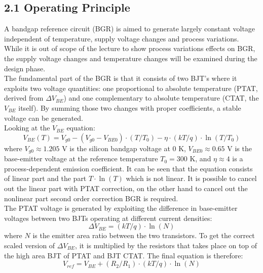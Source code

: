 \documentclass[12pt]{article}
\begin{document}
\subsection*{2.1 Operating Principle}
A bandgap reference circuit (BGR) is aimed to generate largely constant voltage independent of temperature, supply voltage changes and process variations. While it is out of scope of the lecture to show process variations effects on BGR, the supply voltage changes and temperature changes will be examined during the design phase.\\ 
\newline
\noindent
The fundamental part of the BGR is that it consists of two BJT’s where it exploits two voltage quantities: one proportional to absolute temperature (PTAT, derived from $\Delta V_{BE}$) and one complementary to absolute temperature (CTAT, the $V_{BE}$ itself). By summing those two changes with proper coefficients, a stable voltage can be generated. \\
\newline
\noindent
Looking at the $V_{BE}$ equation: 
\begin{equation}
V_{BE}(T) = V_{g0} - (V_{g0} - V_{BE0}) \cdot (T/T_0) - \eta \cdot (kT/q) \cdot \ln(T/T_0)
\end{equation}
where $V_{g0} \approx 1.205$ V is the silicon bandgap voltage at 0 K, $V_{BE0} \approx 0.65$ V is the base-emitter voltage at the reference temperature $T_0 = 300$ K, and $\eta \approx 4$ is a process-dependent emission coefficient. It can be seen that the equation consists of linear part and the part $T \cdot \ln(T)$ which is not linear. It is possible to cancel out the linear part with PTAT correction, on the other hand to cancel out the nonlinear part second order correction BGR is required. \\
\newline
\noindent
The PTAT voltage is generated by exploiting the difference in base-emitter voltages between two BJTs operating at different current densities:
\begin{equation}
\Delta V_{BE} = (kT/q) \cdot \ln(N)
\end{equation}
where $N$ is the emitter area ratio between the two transistors. To get the correct scaled version of $\Delta V_{BE}$, it is multiplied by the resistors that takes place on top of the high area BJT of PTAT and BJT CTAT. The final equation is therefore:
\begin{equation*}
V_{ref} = V_{BE} + (R_2/R_1) \cdot (kT/q) \cdot \ln(N)
\end{equation*}
\end{document}
